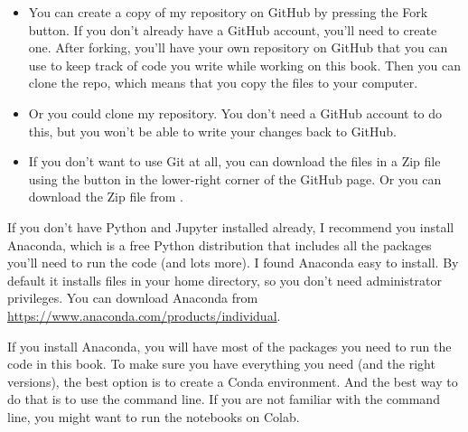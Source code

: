\documentclass[12pt]{book}
\theoremstyle{exercise}
\begin{document}
\begin{itemize}

\item You can create a copy of my repository
on GitHub by pressing the {\sf Fork} button.  If you don't already
have a GitHub account, you'll need to create one.  After forking, you'll
have your own repository on GitHub that you can use to keep track
of code you write while working on this book.  Then you can
clone the repo, which means that you copy the files
to your computer.

\item Or you could clone
my repository.  You don't need a GitHub account to do this, but you
won't be able to write your changes back to GitHub.

\item If you don't want to use Git at all, you can download the files
in a Zip file using the button in the lower-right corner of the
GitHub page.  Or you can download the Zip file from \url{}.

\end{itemize}

If you don't have Python and Jupyter installed already, I recommend you install Anaconda, which is a free Python distribution that includes
all the packages you'll need to run the code (and lots more).
I found Anaconda easy to install.  By default it installs files in your home directory, so you don't need administrator privileges.  You can download Anaconda from \url{https://www.anaconda.com/products/individual}.

If you install Anaconda, you will have most of the packages you need to run the code in this book.
To make sure you have everything you need (and the right versions), the best option is to create a Conda environment.  And the best way to do that is to use the command line.
If you are not familiar with the command line, you might want to run the notebooks on Colab.
\end{document}
